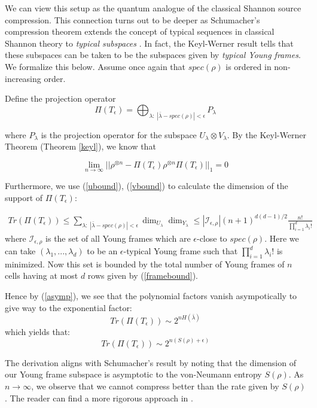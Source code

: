 \documentclass[12pt]{article}%
\begin{document}
We can view this setup as the quantum analogue of the classical Shannon source compression. This connection turns out to be deeper as Schumacher's compression theorem extends the concept of typical sequences in classical Shannon theory to \textit{typical subspaces} \cite{sch}. In fact, the Keyl-Werner result tells that these subspaces can be taken to be the subspaces given by \textit{typical Young frames}. We formalize this below. Assume once again that $spec(\rho)$ is ordered in non-increasing order.

\noindent Define the projection operator $$ \Pi(T_{\epsilon}) = \bigoplus_{\lambda: \; |\bar{\lambda} - spec(\rho)| < \epsilon} P_{\lambda} $$

\noindent where $P_{\lambda}$ is the projection operator for the subspace $U_{\lambda} \otimes V_{\lambda}$. By the Keyl-Werner Theorem (Theorem \ref{keyl}), we know that

$$ \lim_{n \rightarrow \infty} ||\rho^{\otimes n} - \Pi(T_\epsilon) \rho^{\otimes n} \Pi(T_\epsilon) ||_1 = 0$$

\noindent Furthermore, we use (\ref{ubound}), (\ref{vbound}) to calculate the dimension of the support of $\Pi(T_\epsilon)$:

\begin{gather} \label{epsilbound}
  Tr(\Pi(T_\epsilon)) \leq \sum_{\lambda: \; |\bar{\lambda} - spec(\rho)| < \epsilon} \dim_{U_\lambda} \dim_{Y_\lambda} \leq |\mathcal{I}_{\epsilon,\rho}| (n+1)^{d(d-1)/2} \frac{n!}{\prod_{i=1}^d
   \lambda_i!}
\end{gather}
where $\mathcal{I}_{\epsilon,\rho}$ is the set of all Young frames which are $\epsilon$-close to $spec(\rho)$. Here we can take $(\lambda_1,...,\lambda_d)$ to be an $\epsilon$-typical Young frame such that $\prod_{i=1}^d \lambda_i!$ is minimized. Now this set is bounded by the total number of Young frames of $n$ cells having at most $d$ rows given by (\ref{framebound}).

\noindent Hence by (\ref{asymp}), we see that the polynomial factors vanish asympotically to give way to the exponential factor:
$$ Tr(\Pi(T_\epsilon)) \sim 2^{nH({\bar{\lambda}})}  $$
\noindent which yields that:
$$ Tr(\Pi(T_\epsilon)) \sim 2^{n(S(\rho) + \epsilon)}  $$

\noindent The derivation aligns with Schumacher's result by noting that the dimension of our Young frame subspace is asymptotic to the von-Neumann entropy $S(\rho)$. As $n \rightarrow \infty$, we observe that we cannot compress better than the rate given by $S(\rho)$. The reader can find a more rigorous approach in \cite{harrow}.
\end{document}
